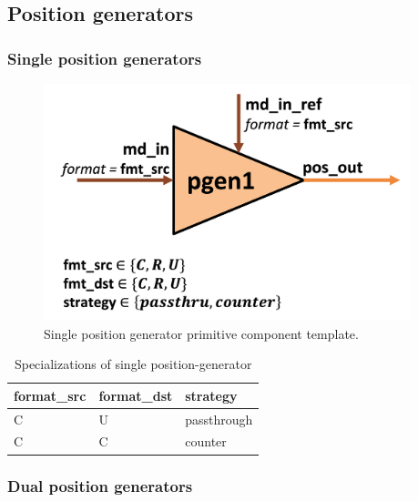 \subsection{Position generators}

\subsubsection{Single position generators}

\begin{figure}[H]
    \centering
    \includegraphics[width=0.95\textwidth]{figures/pgen1.png}
    \caption{Single position generator primitive component template.}
    \label{fig:pgen1}
\end{figure}

\begin{table}[H]
\centering
\begin{tabular}{lll}
\toprule
 format\_src   & format\_dst   & strategy    \\
\midrule
 C            & U            & passthrough \\
 C            & C            & counter     \\
\bottomrule
\end{tabular}
\caption{Specializations of single position-generator}
\label{tab:SinglePositionGenerator_specializations}
\end{table}

\subsubsection{Dual position generators}


